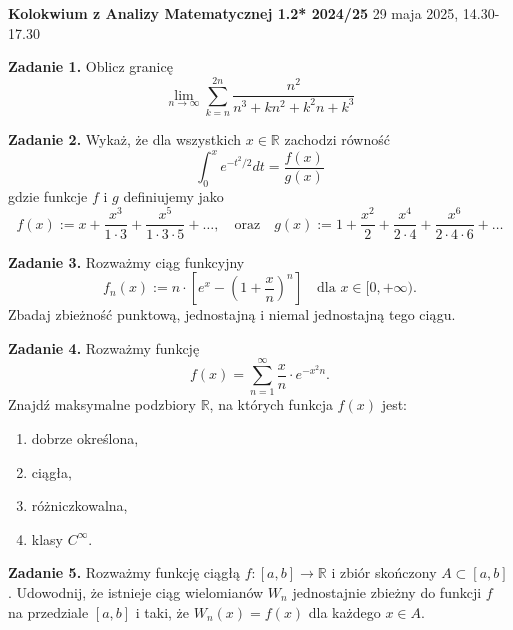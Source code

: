 \documentclass[12pt,a4paper]{article}
\begin{document}
\begin{center}
    \textbf{Kolokwium z Analizy Matematycznej 1.2* 2024/25} %
    29 maja 2025, 14.30-17.30 %
\end{center}

\vspace{0.5cm}

\noindent \textbf{Zadanie 1.} Oblicz granicę %
\[
\lim_{n\to\infty}\sum_{k=n}^{2n}\frac{n^{2}}{n^{3}+kn^{2}+k^{2}n+k^{3}} %
\]

\vspace{0.5cm}

\noindent \textbf{Zadanie 2.} Wykaż, że dla wszystkich $x\in\mathbb{R}$ zachodzi równość %
\[
\int_{0}^{x}e^{-t^{2}/2}dt=\frac{f(x)}{g(x)} %
\]
gdzie funkcje $f$ i $g$ definiujemy jako %
\[
f(x):=x+\frac{x^{3}}{1\cdot3}+\frac{x^{5}}{1\cdot3\cdot5}+\dots, \quad \text{oraz} \quad g(x):=1+\frac{x^{2}}{2}+\frac{x^{4}}{2\cdot4}+\frac{x^{6}}{2\cdot4\cdot6}+\dots %
\]

\vspace{0.5cm}

\noindent \textbf{Zadanie 3.} Rozważmy ciąg funkcyjny %
\[
f_{n}(x):=n\cdot\left[e^{x}-\left(1+\frac{x}{n}\right)^{n}\right] \quad \text{dla } x\in[0,+\infty). %
\]
Zbadaj zbieżność punktową, jednostajną i niemal jednostajną tego ciągu. %

\vspace{0.5cm}

\noindent \textbf{Zadanie 4.} Rozważmy funkcję %
\[
f(x)=\sum_{n=1}^{\infty}\frac{x}{n}\cdot e^{-x^{2}n}. %
\]
Znajdź maksymalne podzbiory $\mathbb{R}$, na których funkcja $f(x)$ jest: %
\begin{enumerate}
    \item[(a)] dobrze określona, %
    \item[(b)] ciągła, %
    \item[(c)] różniczkowalna, %
    \item[(d)] klasy $C^{\infty}$. %
\end{enumerate}

\vspace{0.5cm}

\noindent \textbf{Zadanie 5.} Rozważmy funkcję ciągłą $f:[a,b]\to\mathbb{R}$ i zbiór skończony $A\subset[a,b]$. %
Udowodnij, że istnieje ciąg wielomianów $W_{n}$ jednostajnie zbieżny do funkcji $f$ na przedziale $[a,b]$ i taki, że $W_{n}(x)=f(x)$ dla każdego $x\in A$. %
\end{document}
